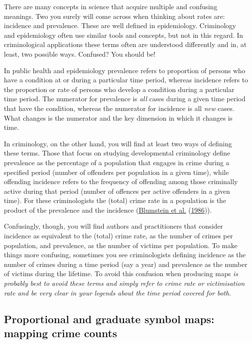 \documentclass[
]{book}
\begin{document}
There are many concepts in science that acquire multiple and confusing meanings. Two you surely will come across when thinking about rates are: incidence and prevalence. These are well defined in epidemiology. Criminology and epidemiology often use similar tools and concepts, but not in this regard. In criminological applications these terms often are understood differently and in, at least, two possible ways. Confused? You should be!

In public health and epidemiology prevalence refers to proportion of persons who have a condition at or during a particular time period, whereas incidence refers to the proportion or rate of persons who develop a condition during a particular time period. The numerator for prevalence is \emph{all} cases during a given time period that have the condition, whereas the numerator for incidence is all \emph{new} cases. What changes is the numerator and the key dimension in which it changes is time.

In criminology, on the other hand, you will find at least two ways of defining these terms. Those that focus on studying developmental criminology define prevalence as the percentage of a population that engages in crime during a specified period (number of offenders per population in a given time), while offending incidence refers to the frequency of offending among those criminally active during that period (number of offences per active offenders in a given time). For these criminologists the (total) crime rate in a population is the product of the prevalence and the incidence (\protect\hyperlink{ref-Blumstein_1986}{Blumstein et al.} (\protect\hyperlink{ref-Blumstein_1986}{1986})).

Confusingly, though, you will find authors and practitioners that consider incidence as equivalent to the (total) crime rate, as the number of crimes per population, and prevalence, as the number of victims per population. To make things more confusing, sometimes you see criminologists defining incidence as the number of crimes during a time period (say a year) and prevalence as the number of victims during the lifetime. To avoid this confusion when producing maps \emph{is probably best to avoid these terms and simply refer to crime rate or victimisation rate and be very clear in your legends about the time period covered for both}.

\hypertarget{proportional-and-graduate-symbol-maps-mapping-crime-counts}{%
\subsection{Proportional and graduate symbol maps: mapping crime counts}\label{proportional-and-graduate-symbol-maps-mapping-crime-counts}}
\end{document}
